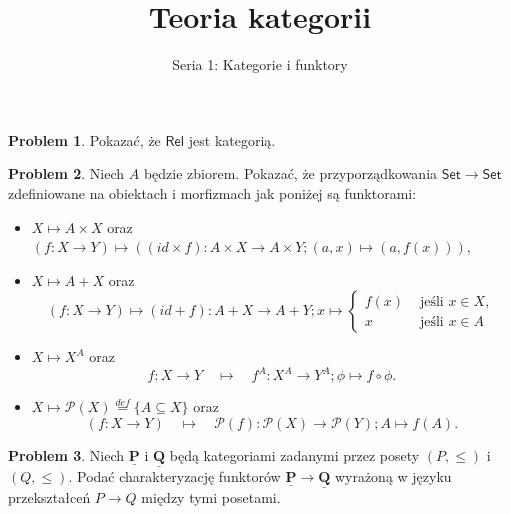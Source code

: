 \documentclass[10pt]{amsart}
\title{Teoria kategorii}
\author{Seria 1: Kategorie i funktory}
\theoremstyle{plain}
\theoremstyle{definition}
\newtheorem{problem}{Problem}
\numberwithin{equation}{section}
\begin{document}
\maketitle
\thispagestyle{empty}

\begin{problem}
    Pokazać, że $\mathsf{Rel}$ jest kategorią. 
\end{problem}

\begin{problem}
Niech $A$ będzie zbiorem. Pokazać, że przyporządkowania $\mathsf{Set}\to \mathsf{Set}$ zdefiniowane na obiektach i morfizmach jak poniżej są funktorami:
\begin{itemize}
\item $X\mapsto A\times X$ oraz $(f:X\to Y)\mapsto \left ((id \times f):A\times X\to A\times Y; (a,x)\mapsto (a,f(x))\right )$,
\item $X\mapsto A+ X$ oraz $$(f:X\to Y)\mapsto (id + f):A+ X\to A+ Y; x \mapsto \left \{ \begin{array}{cc}f(x)  &\text{ jeśli }x\in X, \\ x &\text{ jeśli }x\in A \end{array}\right. $$
\item $X\mapsto X^A$ oraz 
$$
f:X\to Y\quad \mapsto \quad f^A:X^A\to Y^A; \phi\mapsto f\circ \phi. 
$$
\item $X\mapsto \mathcal{P}(X)\stackrel{def}{=} \{ A\subseteq X \}$ oraz 
$$
(f:X\to Y)\quad \mapsto \quad \mathcal{P}(f):\mathcal{P}(X)\to \mathcal{P}(Y); A\mapsto f(A). 
$$
\end{itemize}
\end{problem}

\begin{problem}
Niech $\underline{\mathbf{P}}$ i $\underline{\mathbf{Q}}$ będą kategoriami zadanymi przez posety $(P,\leq)$ i $(Q,\leq)$. Podać charakteryzację funktorów $\underline{\mathbf{P}}\to\underline{\mathbf{Q}}$ wyrażoną w języku przekształceń $P\to Q$ między tymi posetami.
\end{problem}


\end{document}
